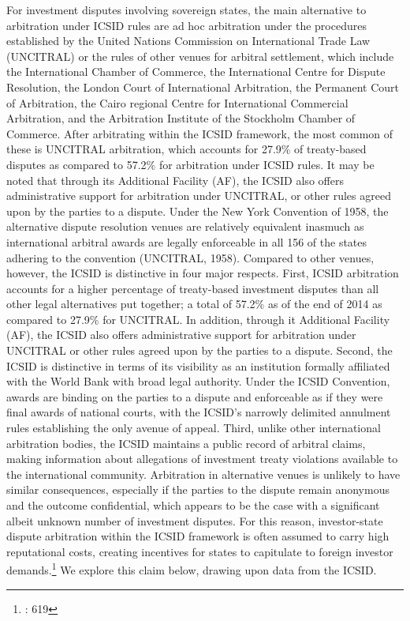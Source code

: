 \documentclass[12pt,onesided]{amsart}
\begin{document}
For investment disputes involving sovereign states, the main alternative to arbitration under ICSID rules are ad hoc arbitration under the procedures established by the United Nations Commission on International Trade Law (UNCITRAL) or the rules of other venues for arbitral settlement, which include the International Chamber of Commerce, the International Centre for Dispute Resolution, the London Court of International Arbitration, the Permanent Court of Arbitration, the Cairo regional Centre for International Commercial Arbitration, and the Arbitration Institute of the Stockholm Chamber of Commerce. After arbitrating within the ICSID framework, the most common of these is UNCITRAL arbitration, which accounts for 27.9\% of treaty-based disputes as compared to 57.2\% for arbitration under ICSID rules. It may be noted that through its Additional Facility (AF), the ICSID also offers administrative support for arbitration under UNCITRAL, or other rules agreed upon by the parties to a dispute. Under the New York Convention of 1958, the alternative dispute resolution venues are relatively equivalent inasmuch as international arbitral awards are legally enforceable in all 156 of the states adhering to the convention (UNCITRAL, 1958). Compared to other venues, however, the ICSID is distinctive in four major respects. First, ICSID arbitration accounts for a higher percentage of treaty-based investment disputes than all other legal alternatives put together; a total of 57.2\% as of the end of 2014 as compared to 27.9\% for UNCITRAL. In addition, through it Additional Facility (AF), the ICSID also offers administrative support for arbitration under UNCITRAL or other rules agreed upon by the parties to a dispute. Second, the  ICSID is distinctive in terms of its visibility as an institution formally affiliated with the World Bank with broad legal authority. Under the ICSID Convention, awards are binding on the parties to a dispute and enforceable as if they were final awards of national courts, with the ICSID's narrowly delimited annulment rules establishing the only avenue of appeal. Third, unlike other international arbitration bodies, the ICSID maintains a public record of arbitral claims, making information about allegations of investment treaty violations available to the international community. Arbitration in alternative venues is unlikely to have similar consequences, especially if the parties to the dispute remain anonymous and the outcome confidential, which appears to be the case with a significant albeit unknown number of investment disputes. For this reason, investor-state dispute arbitration within the ICSID framework is often assumed to carry high reputational costs, creating incentives for states to capitulate to foreign investor demands.\footnote{\citet{trakman:2013}: 619}  We explore this claim below, drawing upon data from the ICSID.
\end{document}
